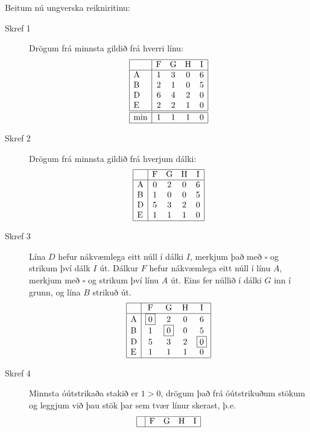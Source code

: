 \begin{lausn}
Beitum nú ungverska reikniritinu:
\begin{description}
 \item[Skref 1] Drögum frá minnsta gildið frá hverri línu:
\[ \begin{array}{|l|cccc|}\hline & \textrm{F} & \textrm{G} & \textrm{H} & \textrm{I} \\ \hline
    \textrm{A} & 1 & 3 & 0 & 6\\
    \textrm{B} & 2 & 1 & 0 & 5 \\
    \textrm{D} & 6 & 4 & 2 & 0 \\
    \textrm{E} & 2 & 2 & 1 & 0  \\ \hline \hline
    \min & 1&1&1&0 \\ \hline
   \end{array}\]
 \item[Skref 2] Drögum frá minnsta gildið frá hverjum dálki:
\[ \begin{array}{|l|cccc|}\hline & \textrm{F} & \textrm{G} & \textrm{H} & \textrm{I} \\ \hline
    \textrm{A} & 0 & 2 & 0 & 6\\
    \textrm{B} & 1 & 0 & 0 & 5 \\
    \textrm{D} & 5 & 3 & 2 & 0 \\
    \textrm{E} & 1 & 1 & 1 & 0  \\ \hline 
   \end{array}\]
\item[Skref 3]Lína $D$ hefur nákvæmlega eitt núll í dálki $I$, merkjum það með $\square$ og strikum því dálk $I$ út.
  Dálkur $F$ hefur nákvæmlega eitt núll í línu $A$, merkjum með $\square$ og strikum því línu $A$ út.
Eins fer núllið í dálki $G$ inn í grunn, og lína $B$ strikuð út.   
\[ \begin{array}{|l|cccc|}\hline & \textrm{F} & \textrm{G} & \textrm{H} & \textrm{I} \\ \hline
    \textrm{A} & \fbox{0} & 2 & 0 & 6\\
    \textrm{B} & 1 & \fbox{0} & 0 & 5 \\
    \textrm{D} & 5 & 3 & 2 & \fbox{0} \\
    \textrm{E} & 1 & 1 & 1 & 0  \\ \hline 
   \end{array}\]
\item[Skref 4]Minnsta óútstrikaða stakið er $1>0$, drögum það frá óútstrikuðum stökum og leggjum við þau stök þar sem tvær línur skerast, þ.e.
\[ \begin{array}{|l|cccc|}\hline & \textrm{F} & \textrm{G} & \textrm{H} & \textrm{I} \\ \hline

\end{array}\]
\end{description}
\end{lausn}
